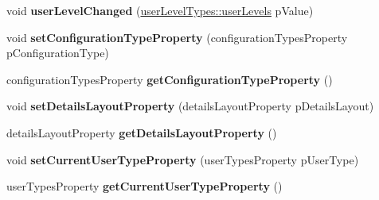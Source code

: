\begin{DoxyCompactItemize}
\item 
\hypertarget{classQERecipe_a042bfa23d64b9e64264a19707339be6b}{
void {\bfseries userLevelChanged} (\hyperlink{classuserLevelTypes_a033cf2a40f620286b1839dd360c8497b}{userLevelTypes::userLevels} pValue)}
\label{classQERecipe_a042bfa23d64b9e64264a19707339be6b}

\item 
\hypertarget{classQERecipe_a126c3a359098cf3d95d62859d94f6b8a}{
void {\bfseries setConfigurationTypeProperty} (configurationTypesProperty pConfigurationType)}
\label{classQERecipe_a126c3a359098cf3d95d62859d94f6b8a}

\item 
\hypertarget{classQERecipe_a4f8660a3bf7ebb92daf576bb5fa4ae17}{
configurationTypesProperty {\bfseries getConfigurationTypeProperty} ()}
\label{classQERecipe_a4f8660a3bf7ebb92daf576bb5fa4ae17}

\item 
\hypertarget{classQERecipe_a02ccd1fa9ea49c5a6bf8e25d42d13a56}{
void {\bfseries setDetailsLayoutProperty} (detailsLayoutProperty pDetailsLayout)}
\label{classQERecipe_a02ccd1fa9ea49c5a6bf8e25d42d13a56}

\item 
\hypertarget{classQERecipe_ae725f6964c79c93087df88034c88fbe1}{
detailsLayoutProperty {\bfseries getDetailsLayoutProperty} ()}
\label{classQERecipe_ae725f6964c79c93087df88034c88fbe1}

\item 
\hypertarget{classQERecipe_aee30a9d153da69137f79a8da2326278d}{
void {\bfseries setCurrentUserTypeProperty} (userTypesProperty pUserType)}
\label{classQERecipe_aee30a9d153da69137f79a8da2326278d}

\item 
\hypertarget{classQERecipe_aca1690c7a777b5a2f6013fbd5f6fc0e8}{
userTypesProperty {\bfseries getCurrentUserTypeProperty} ()}
\label{classQERecipe_aca1690c7a777b5a2f6013fbd5f6fc0e8}

\end{DoxyCompactItemize}
